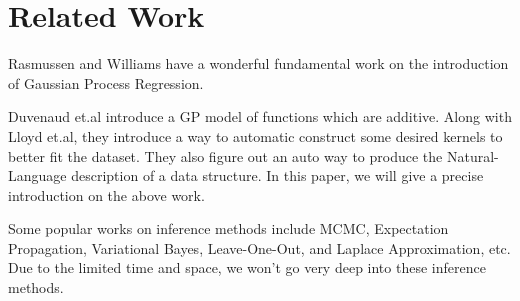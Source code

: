 \section{Related Work} \label{sec:related}
Rasmussen\cite{rasmussen2006gaussian} and Williams\cite{williams1998prediction} have a wonderful fundamental work on the introduction of Gaussian Process Regression.



Duvenaud et.al introduce a GP model of functions which are additive\cite{duvenaud2011additive}.
Along with Lloyd et.al, they introduce a way to automatic construct some desired kernels to better fit the dataset\cite{duvenaud2013structure,duvenaud2014automatic}.
They also figure out an auto way to produce the Natural-Language description of a data structure\cite{lloyd2014automatic}.
In this paper, we will give a precise introduction on the above work.

Some popular works on inference methods include
MCMC\cite{gamerman1997sampling},
Expectation Propagation\cite{minka2001expectation},
Variational Bayes\cite{palmer2006variational,nickisch2009convex},
Leave-One-Out\cite{fukunaga1989leave},
and Laplace Approximation\cite{tierney1986accurate},
etc.
Due to the limited time and space, we won't go very deep into these inference methods.\\ \\